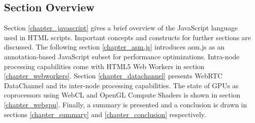 \subsection{Section Overview}

Section \ref{chapter_javascript} gives a brief overview of the JavaScript language used in HTML scripts. Important concepts and constructs for further sections are discussed. The following section \ref{chapter_asm.js} introduces asm.js as an annotation-based JavaScript subset for performance optimizations. Intra-node processing capabilities come with HTML5 Web Workers in section \ref{chapter_webworkers}. Section \ref{chapter_datachannel} presents WebRTC DataChannel and its inter-node processing capabilities. The state of GPUs as coprocessors using WebCL and OpenGL Compute Shaders is shown in section \ref{chapter_webgpu}. Finally, a summary is presented and a conclusion is drawn in sections \ref{chapter_summary} and \ref{chapter_conclusion} respectively.
